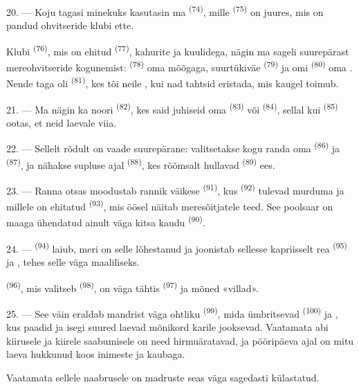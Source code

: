 20. --- Koju tagasi minekuks kasutasin ma 
\textsuperscript{(74)}, mille  \textsuperscript{(75)} on 
juures, mis on pandud ohvitseride klubi ette.

Klubi  \textsuperscript{(76)}, mis on ehitud 
\textsuperscript{(77)}, kahurite ja kuulidega, nägin ma sageli suurepärast mereohvitseride
kogunemist:  \textsuperscript{(78)} oma mõõgaga, suurtükiväe
 \textsuperscript{(79)} ja  omi \textsuperscript{(80)} oma
. Nende taga oli  \textsuperscript{(81)}, kes tõi neile
, kui nad tahtsid eristada, mis kaugel toimub.

21. --- Ma nägin ka noori  \textsuperscript{(82)}, kes said
juhiseid oma  \textsuperscript{(83)} või 
\textsuperscript{(84)}, sellal kui  \textsuperscript{(85)} ootas, et neid
laevale viia.

22. --- Sellelt rõdult on vaade suurepärane: valitsetakse kogu randa oma
 \textsuperscript{(86)} ja  \textsuperscript{(87)}, ja
nähakse supluse ajal  \textsuperscript{(88)}, kes rõõmsalt hullavad
 \textsuperscript{(89)} ees.

23. --- Ranna otsas moodustab rannik väikese 
 \textsuperscript{(91)}, kus  \textsuperscript{(92)}
tulevad murduma ja millele on ehitatud  \textsuperscript{(93)}, mis öösel
näitab meresõitjatele teed. See poolsaar on maaga ühendatud ainult väga kitsa
 kaudu \textsuperscript{(90)}.

\VUsaut{3.0mm}
\VUsaut{3.0mm}

24. ---  \textsuperscript{(94)} laiub, meri on selle lõhestanud ja joonistab
sellesse kapriisselt rea  \textsuperscript{(95)} ja ,
tehes selle väga maaliliseks.

 \textsuperscript{(96)}, mis valitseb 
\textsuperscript{(98)}, on väga tähtis  \textsuperscript{(97)} ja mõned
«villad».

25. --- See väin eraldab mandrist väga ohtliku  \textsuperscript{(99)},
mida ümbritsevad  \textsuperscript{(100)} ja , kus paadid
ja isegi suured laevad mõnikord karile jooksevad. Vaatamata abi kiirusele ja
 kiirele saabumisele on need  hirmuäratavad, ja
pööripäeva  ajal on mitu laeva hukkunud koos inimeste ja kaubaga.

Vaatamata sellele naabrusele on  madruste seas väga sagedasti külastatud.

\VUsaut{6.0mm}
\VUfilet{22mm}

